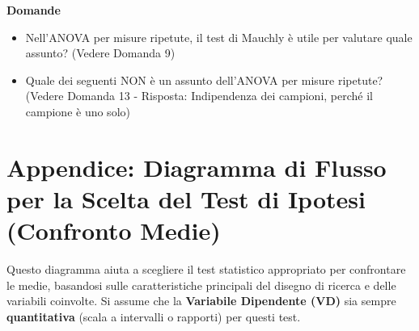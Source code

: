 \documentclass[12pt, a4paper]{article}
\newenvironment{reflectionbox}{%
    \medskip
    \begin{framed}\par\noindent
    \textbf{\color{boxtitlecolor}Domande} \par
    \begin{itemize}[leftmargin=*, label=$\blacktriangleright$]
}{%
    \end{itemize}\par
    \end{framed}
    \medskip
}
\begin{document}
\begin{reflectionbox}
    \item Nell'ANOVA per misure ripetute, il test di Mauchly è utile per valutare quale assunto? (Vedere Domanda 9)
    \item Quale dei seguenti NON è un assunto dell'ANOVA per misure ripetute? (Vedere Domanda 13 - Risposta: Indipendenza dei campioni, perché il campione è uno solo)
\end{reflectionbox}


\newpage %
\appendix
\section*{Appendice: Diagramma di Flusso per la Scelta del Test di Ipotesi (Confronto Medie)}
\label{sec:appendice_flowchart}

Questo diagramma aiuta a scegliere il test statistico appropriato per confrontare le medie, basandosi sulle caratteristiche principali del disegno di ricerca e delle variabili coinvolte. Si assume che la \textbf{Variabile Dipendente (VD)} sia sempre \textbf{quantitativa} (scala a intervalli o rapporti) per questi test.
\end{document}
